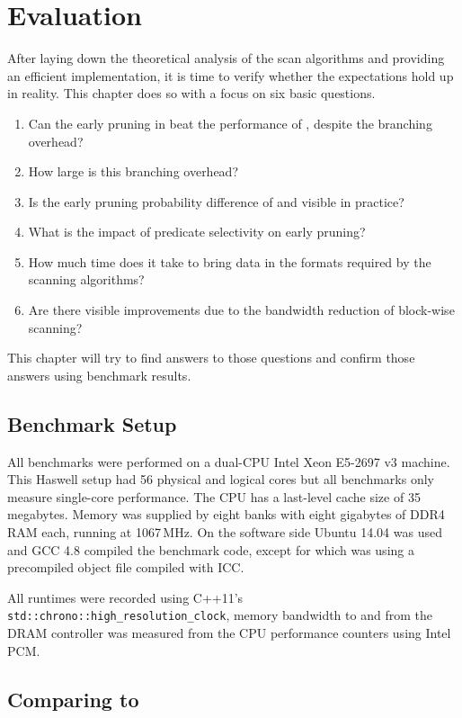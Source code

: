 \chapter{Evaluation}
\label{chapter:evaluation}

After laying down the theoretical analysis of the scan algorithms and providing
an efficient implementation, it is time to verify whether the expectations hold
up in reality. This chapter does so with a focus on six basic questions.

\begin{enumerate}
  \item Can the early pruning in \bwv{} beat the performance of \simdscan{},
despite the branching overhead?
  \item How large is this branching overhead?
  \item Is the early pruning probability difference of \bwv{} and \bs{} visible in practice?
  \item What is the impact of predicate selectivity on early pruning?
  \item How much time does it take to bring data in the formats required by the scanning algorithms?
  \item Are there visible improvements due to the bandwidth reduction of block-wise scanning?
\end{enumerate}

This chapter will try to find answers to those questions and confirm those
answers using benchmark results.

\section{Benchmark Setup}

All benchmarks were performed on a dual-CPU Intel Xeon E5-2697 v3 machine. This
Haswell setup had 56 physical and logical cores but all benchmarks only measure
single-core performance. The CPU has a last-level cache size of 35 megabytes.
Memory was supplied by eight banks with eight gigabytes of DDR4 RAM each,
running at 1067\,MHz. On the software side Ubuntu 14.04 was used and GCC 4.8
compiled the benchmark code, except for \simdscan{} which was using a
precompiled object file compiled with ICC.

All runtimes were recorded using C++11's
\texttt{std::chrono::high\_resolution\_clock}, memory bandwidth to and from the
DRAM controller was measured from the CPU performance counters using Intel PCM.

\section{Comparing \simdscan{} to \bwv{}}

